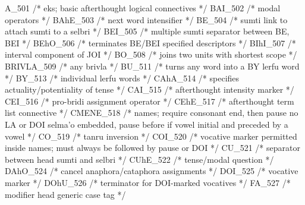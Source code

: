 A_501            /*        eks; basic afterthought logical connectives */
BAI_502          /*        modal operators */
BAhE_503         /*        next word intensifier */
BE_504           /*        sumti link to attach sumti to a selbri */
BEI_505          /*        multiple sumti separator between BE, BEI */
BEhO_506         /*        terminates BE/BEI specified descriptors */
BIhI_507         /*        interval component of JOI */
BO_508           /*        joins two units with shortest scope */
BRIVLA_509       /*        any brivla */
BU_511           /*        turns any word into a BY lerfu word */
BY_513           /*        individual lerfu words */
CAhA_514         /*        specifies actuality/potentiality of tense */
CAI_515          /*        afterthought intensity marker */
CEI_516          /*        pro-bridi assignment operator */
CEhE_517         /*        afterthought term list connective */
CMENE_518        /*        names; require consonant end, then pause no
                                   LA or DOI selma'o embedded, pause before if
                                   vowel initial and preceded by a vowel */
CO_519           /*        tanru inversion  */
COI_520          /*        vocative marker permitted inside names; must
                                   always be followed by pause or DOI */
CU_521           /*        separator between head sumti and selbri */
CUhE_522         /*        tense/modal question */
DAhO_524         /*        cancel anaphora/cataphora assignments */
DOI_525          /*        vocative marker */
DOhU_526         /*        terminator for DOI-marked vocatives */
FA_527           /*        modifier head generic case tag */
